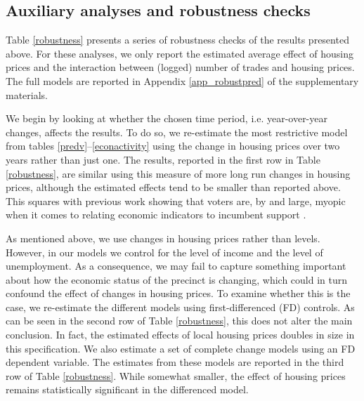\documentclass[12pt,a4paper]{article}
\begin{document}
	
	
	\subsection{Auxiliary analyses and robustness checks}
	Table \ref{robustness} presents a series of robustness checks of the results presented above. For these analyses, we only report the estimated average effect of housing prices and the interaction between (logged) number of trades and housing prices. The full models are reported in Appendix \ref{app_robustpred} of the supplementary materials.
	
	
	
	We begin by looking at whether the chosen time period, i.e. year-over-year changes, affects the results. To do so, we re-estimate the most restrictive model from tables \ref{predv}--\ref{econactivity} using the change in housing prices over two years rather than just one. The results, reported in the first row in Table \ref{robustness}, are similar using this measure of more long run changes in housing prices, although the estimated effects tend to be smaller than reported above. This squares with previous work showing that voters are, by and large, myopic when it comes to relating economic indicators to incumbent support \citep{healy2009myopic,healy2014substituting}.
	
	As mentioned above, we use changes in housing prices rather than levels. However, in our models we control for the level of income and the level of unemployment. As a consequence, we may fail to capture something important about how the economic status of the precinct is changing, which could in turn confound the effect of changes in housing prices. To examine whether this is the case, we re-estimate the different models using first-differenced (FD) controls. As can be seen in the second row of Table \ref{robustness}, this does not alter the main conclusion. In fact, the estimated effects of local housing prices doubles in size in this specification. We also estimate a set of complete change models using an FD dependent variable. The estimates from these models are reported in the third row of Table \ref{robustness}. While somewhat smaller, the effect of housing prices remains statistically significant in the differenced model.
	
\end{document}

